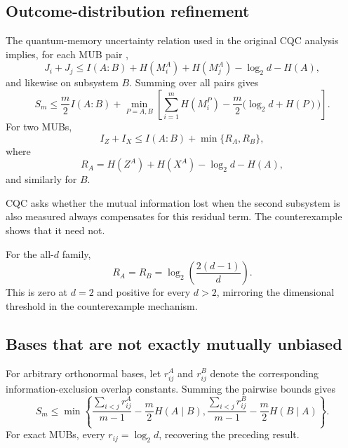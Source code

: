 \subsection{Outcome-distribution refinement}

The quantum-memory uncertainty relation used in the original CQC analysis implies, for each MUB pair \cite{Berta2010,Schneeloch2014},
\begin{equation}
J_i+J_j
\le I(A:B)+H(M_i^A)+H(M_j^A)-\log_2d-H(A),
\end{equation}
and likewise on subsystem $B$. Summing over all pairs gives
\begin{equation}
S_m\le\frac{m}{2}I(A:B)
+\min_{P=A,B}\left[
\sum_{i=1}^{m}H(M_i^P)-\frac{m}{2}\bigl(\log_2d+H(P)\bigr)
\right].
\end{equation}
For two MUBs,
\begin{equation}
I_Z+I_X\le I(A:B)+\min\{R_A,R_B\},
\end{equation}
where
\begin{equation}
R_A=H(Z^A)+H(X^A)-\log_2d-H(A),
\end{equation}
and similarly for $B$.

CQC asks whether the mutual information lost when the second subsystem is also measured always compensates for this residual term. The counterexample shows that it need not.

For the all-$d$ family,
\begin{equation}
R_A=R_B=\log_2\!\left(\frac{2(d-1)}{d}\right).
\end{equation}
This is zero at $d=2$ and positive for every $d>2$, mirroring the dimensional threshold in the counterexample mechanism.

\subsection{Bases that are not exactly mutually unbiased}

For arbitrary orthonormal bases, let $r_{ij}^A$ and $r_{ij}^B$ denote the corresponding information-exclusion overlap constants. Summing the pairwise bounds gives \cite{ColesPiani2014,Iqbal2026}
\begin{equation}
S_m\le\min\left\{
\frac{\sum_{i<j}r_{ij}^A}{m-1}-\frac{m}{2}H(A\mid B),
\frac{\sum_{i<j}r_{ij}^B}{m-1}-\frac{m}{2}H(B\mid A)
\right\}.
\end{equation}
For exact MUBs, every $r_{ij}=\log_2d$, recovering the preceding result.
